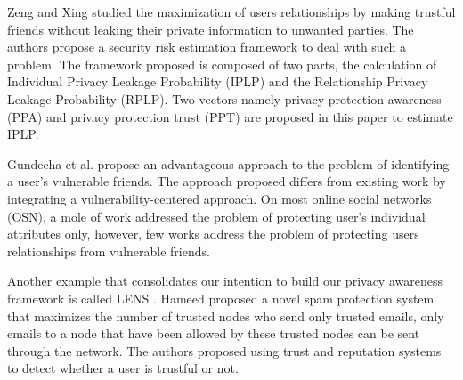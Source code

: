Zeng and Xing \cite{zeng_trustaware_2014}
	studied the maximization of users relationships by making trustful friends without leaking their private information to unwanted parties.
The authors propose a security risk estimation framework to deal with such a problem.
The framework proposed is composed of two parts,
	the calculation of Individual Privacy Leakage Probability (IPLP) and the Relationship Privacy Leakage Probability (RPLP).
Two vectors namely privacy protection awareness (PPA) and privacy protection trust (PPT) are proposed in this paper to estimate IPLP.


Gundecha et al. \cite{gundecha_exploiting_2011} propose an advantageous approach to the problem of identifying a user’s vulnerable friends.
The approach proposed differs from existing work by integrating a vulnerability-centered approach.
On most online social networks (OSN),
	a mole of work addressed the problem of protecting user's individual attributes only,
	however,
	few works address the problem of protecting users relationships from vulnerable friends.

Another example that consolidates our intention to build our privacy awareness framework is called LENS \cite{hameed_lens_2011}.
Hameed \cite{hameed_lens_2011} proposed a novel spam protection system that maximizes the number of trusted nodes who send only trusted emails,
	only emails to a node that have been allowed by these trusted nodes can be sent through the network.
The authors proposed using trust and reputation systems to detect whether a user is trustful or not.

